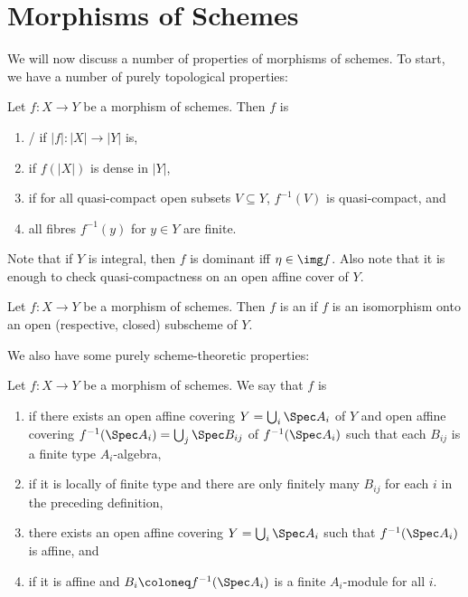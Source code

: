 \documentclass[wip, algebra]{bsteffan-lecturenotes}
\begin{document}
\section{Morphisms of Schemes}
We will now discuss a number of properties of morphisms of schemes.
To start, we have a number of purely topological properties:
\begin{definition}
	Let $f\colon X \to Y$ be a morphism of schemes.
	Then $f$ is\textellipsis{}
	\begin{enumerate}
		\item {}/ if $|f|\colon |X| \to |Y|$ is, 
		\item {} if $f(|X|)$ is dense in $|Y|$,
		\item {} if for all quasi-compact open subsets $V \subseteq Y$, $f^{-1}(V)$ is quasi-compact, and
		\item {} all fibres $f^{-1}(y)$ for $y \in Y$ are finite.
	\end{enumerate}
\end{definition}
Note that if $Y$ is integral, then $f$ is dominant iff $\eta \in \img f$.
Also note that it is enough to check quasi-compactness on an open affine cover of $Y$.
\begin{definition}
	Let $f\colon X \to Y$ be a morphism of schemes.
	Then $f$ is an  if $f$ is an isomorphism onto an open (respective, closed) subscheme of $Y$.
\end{definition}
We also have some purely scheme-theoretic properties:
\begin{definition}
	Let $f\colon X \to Y$ be a morphism of schemes.
	We say that $f$ is\textellipsis{}
	\begin{enumerate}
		\item {} if there exists an open affine covering $Y = \bigcup_i \Spec A_i$ of $Y$ and open affine covering $f^{-1}(\Spec A_i) = \bigcup_j \Spec B_{ij}$ of $f^{-1}(\Spec A_i)$ such that each $B_{ij}$ is a finite type $A_i$-algebra,
		\item {} if it is locally of finite type and there are only finitely many $B_{ij}$ for each $i$ in the preceding definition,
		\item {} there exists an open affine covering $Y = \bigcup_i \Spec A_i$ such that $f^{-1}(\Spec A_i)$ is affine, and
		\item {} if it is affine and $B_i \coloneq f^{-1}(\Spec A_i)$ is a finite $A_i$-module for all $i$.
	\end{enumerate}
\end{definition}
\end{document}

